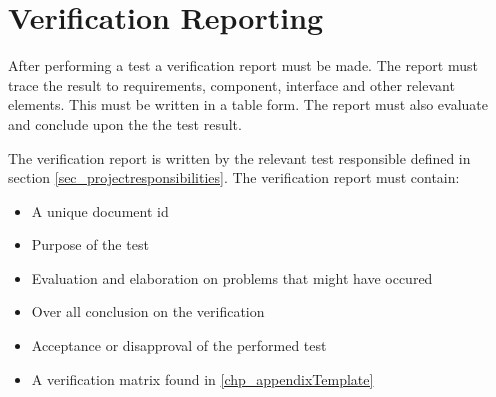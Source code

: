 \label{chp:verificationReporting}
\chapter{Verification Reporting}

After performing a test a verification report must be made. The report must trace the result to requirements, component, interface and other relevant elements. This must be written in a table form. The report must also evaluate and conclude upon the the test result.

The verification report is written by the relevant test responsible defined in section \ref{sec_projectresponsibilities}. The verification report must contain:

\begin{itemize}
	\item A unique document id
	\item Purpose of the test
	\item Evaluation and elaboration on problems that might have occured
	\item Over all conclusion on the verification
	\item Acceptance or disapproval of the performed test
	\item A verification matrix found in \ref{chp_appendixTemplate}
\end{itemize}
